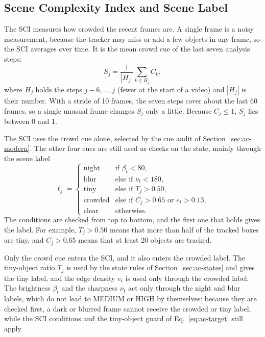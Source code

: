 \subsection{Scene Complexity Index and Scene Label}\label{sec:ac-sci}
The SCI measures how crowded the recent frames are. A single frame is a noisy measurement, because the tracker may miss or add a few objects in any frame, so the SCI averages over time. It is the mean crowd cue of the last seven analysis steps:
\begin{equation}
S_j=\frac{1}{|H_j|}\sum_{k\in H_j} C_k,
\label{eq:ac-sci}
\end{equation}
where $H_j$ holds the steps $j-6,\dots,j$ (fewer at the start of a video) and $|H_j|$ is their number. With a stride of 10 frames, the seven steps cover about the last 60 frames, so a single unusual frame changes $S_j$ only a little. Because $C_j\le1$, $S_j$ lies between 0 and 1.

The SCI uses the crowd cue alone, selected by the cue audit of Section~\ref{sec:ac-modern}. The other four cues are still used as checks on the state, mainly through the scene label
\begin{equation}
\ell_j=\begin{cases}
\text{night}   & \text{if } \beta_t<80,\\
\text{blur}    & \text{else if } \nu_t<180,\\
\text{tiny}    & \text{else if } T_j>0.50,\\
\text{crowded} & \text{else if } C_j>0.65 \text{ or } e_t>0.13,\\
\text{clear}   & \text{otherwise.}
\end{cases}
\label{eq:ac-label}
\end{equation}
The conditions are checked from top to bottom, and the first one that holds gives the label. For example, $T_j>0.50$ means that more than half of the tracked boxes are tiny, and $C_j>0.65$ means that at least 20 objects are tracked.

Only the crowd cue enters the SCI, and it also enters the crowded label. The tiny-object ratio $T_j$ is used by the state rules of Section~\ref{sec:ac-states} and gives the tiny label, and the edge density $e_t$ is used only through the crowded label. The brightness $\beta_t$ and the sharpness $\nu_t$ act only through the night and blur labels, which do not lead to MEDIUM or HIGH by themselves: because they are checked first, a dark or blurred frame cannot receive the crowded or tiny label, while the SCI conditions and the tiny-object guard of Eq.~\eqref{eq:ac-target} still apply.

